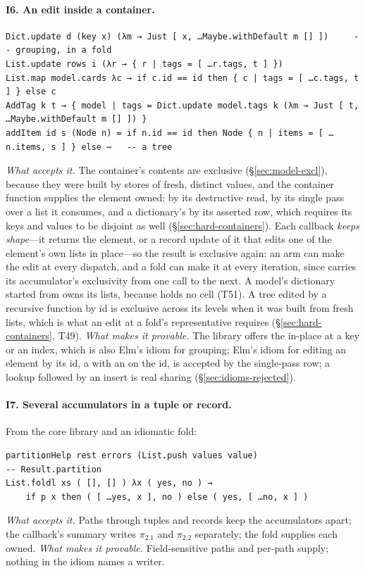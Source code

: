 \paragraph{I6. An edit inside a container.}
\begin{Verbatim}
Dict.update d (key x) (λm → Just [ x, …Maybe.withDefault m [] ])     -- grouping, in a fold
List.update rows i (λr → { r | tags = [ …r.tags, t ] })
List.map model.cards λc → if c.id == id then { c | tags = [ …c.tags, t ] } else c
AddTag k t → { model | tags = Dict.update model.tags k (λm → Just [ t, …Maybe.withDefault m [] ]) }
addItem id s (Node n) = if n.id == id then Node { n | items = [ …n.items, s ] } else ⋯   -- a tree
\end{Verbatim}
\emph{What accepts it.} The container's contents are exclusive (\S\ref{sec:model-excl}), because they were
built by stores of fresh, distinct values, and the container function supplies the element owned:
 by its destructive read,  by its single pass over a list it consumes, and a
dictionary's  by its asserted row, which requires its keys and values to be disjoint as well
(\S\ref{sec:hard-containers}). Each callback \emph{keeps shape}---it returns the element, or a record
update of it that edits one of the element's own lists in place---so the result is exclusive again: an
 arm can make the edit at every dispatch, and a fold can make it at every iteration, since
 carries its accumulator's exclusivity from one call to the next. A model's dictionary
started from  owns its lists, because  holds no cell (T51). A tree
edited by a recursive function by id is exclusive across its levels when it was built from fresh lists,
which is what an edit at a fold's representative requires (\S\ref{sec:hard-containers}, T49).
\emph{What makes it provable.} The library offers the in-place  at a key or an index, which is also Elm's idiom
for grouping; Elm's idiom for editing an element by its id, a  with an  on the id, is
accepted by the single-pass row; a lookup followed by an insert is real sharing
(\S\ref{sec:idioms-rejected}).

\paragraph{I7. Several accumulators in a tuple or record.} From the core library and an idiomatic fold:
\begin{Verbatim}
partitionHelp rest errors (List.push values value)                     -- Result.partition
List.foldl xs ( [], [] ) λx ( yes, no ) →
    if p x then ( [ …yes, x ], no ) else ( yes, [ …no, x ] )
\end{Verbatim}
\emph{What accepts it.} Paths through tuples and records keep the accumulators apart; the callback's
summary writes $\pi_2.1$ and $\pi_2.2$ separately; the fold supplies each owned. \emph{What makes it
provable.} Field-sensitive paths and per-path supply; nothing in the idiom names a writer.

